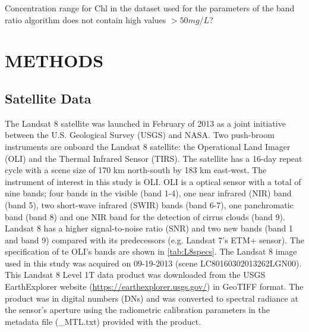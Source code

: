 \documentclass[]{spie}  %
\begin{document}
Concentration range for Chl in the dataset used for the parameters of the band ratio algorithm does not contain high values $> 50mg/L?$

\section{METHODS}
\label{sec:methods}
\subsection{Satellite Data}
The Landsat 8 satellite was launched in February of 2013 as a joint initiative between the U.S. Geological Survey (USGS) and NASA. Two push-broom instruments are onboard the Landsat 8 satellite: the Operational Land Imager (OLI) and the Thermal Infrared Sensor (TIRS). The satellite has a 16-day repeat cycle with a scene size of 170 km north-south by 183 km east-west. The instrument of interest in this study is OLI. OLI is a optical sensor with a total of nine bands; four bands in the visible (band 1-4), one near infrared (NIR) band (band 5), two short-wave infrared (SWIR) bands (band 6-7), one panchromatic band (band 8) and one NIR band for the detection of cirrus clouds (band 9). Landsat 8 has a higher signal-to-noise ratio (SNR) and two new bands (band 1 and band 9) compared with its predecessors (e.g. Landsat 7’s ETM+ sensor). The specification of te OLI's bands are shown in \autoref{tab:L8specs}. The Landsat 8 image used in this study was acquired on 09-19-2013 (scene LC80160302013262LGN00). This Landsat 8 Level 1T data product was downloaded from the USGS EarthExplorer website (\url{https://earthexplorer.usgs.gov/}) in GeoTIFF format. The product was in digital numbers (DNs) and was converted to spectral radiance at the sensor's aperture using the radiometric calibration parameters in the metadata file (\_MTL.txt) provided with the product.
\end{document}
